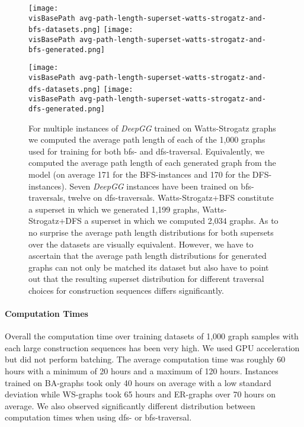 \documentclass{article}
\newcommand{\visBasePath}[0]{vis/}
\begin{document}
\begin{figure*}
  \begin{minipage}[c]{0.48\linewidth}
    \texttt{[image: \\visBasePath avg-path-length-superset-watts-strogatz-and-bfs-datasets.png]}
    \texttt{[image: \\visBasePath avg-path-length-superset-watts-strogatz-and-bfs-generated.png]}
  \end{minipage}\hfill
  \begin{minipage}[c]{0.48\linewidth}
    \texttt{[image: \\visBasePath avg-path-length-superset-watts-strogatz-and-dfs-datasets.png]}
    \texttt{[image: \\visBasePath avg-path-length-superset-watts-strogatz-and-dfs-generated.png]}
  \end{minipage}
    \caption{
      For multiple instances of \textit{DeepGG} trained on Watts-Strogatz graphs we computed the average path length of each of the 1,000 graphs used for training for both bfs- and dfs-traversal.
      Equivalently, we computed the average path length of each generated graph from the model (on average 171 for the BFS-instances and 170 for the DFS-instances).
      Seven \textit{DeepGG} instances have been trained on bfs-traversals, twelve on dfs-traversals.
      Watts-Strogatz+BFS constitute a superset in which we generated 1,199 graphs, Watts-Strogatz+DFS a superset in which we computed 2,034 graphs.
      As to no surprise the average path length distributions for both supersets over the datasets are visually equivalent.
      However, we have to ascertain that the average path length distributions for generated graphs can not only be matched its dataset but also have to point out that the resulting superset distribution for different traversal choices for construction sequences differs significantly.
    }
    \label{fig:avg-path-length-supersets}
\end{figure*}


\paragraph{Computation Times} Overall the computation time over training datasets of 1,000 graph samples with each large construction sequences has been very high.
We used GPU acceleration but did not perform batching.
The average computation time was roughly 60 hours with a minimum of 20 hours and a maximum of 120 hours.
Instances trained on BA-graphs took only 40 hours on average with a low standard deviation while WS-graphs took 65 hours and ER-graphs over 70 hours on average.
We also observed significantly different distribution between computation times when using dfs- or bfs-traversal.
\end{document}
